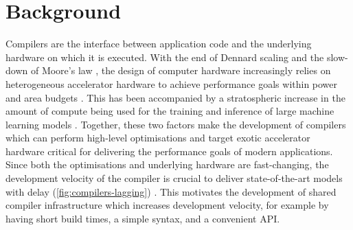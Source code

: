 \chapter{Background}
\label{chap:background}

%

Compilers are the interface between application code and the underlying hardware on which it is executed.
With the end of Dennard scaling and the slow-down of Moore's law \cite{esmaeilzadehDarkSiliconEnd2012}, the design of computer hardware increasingly relies on heterogeneous accelerator hardware to achieve performance goals within power and area budgets \cite{fuchsAcceleratorWallLimits2019}.
This has been accompanied by a stratospheric increase in the amount of compute being used for the training and inference of large machine learning models \cite{desislavovTrendsAIInference2023}.
Together, these two factors make the development of compilers which can perform high-level optimisations and target exotic accelerator hardware critical for delivering the performance goals of modern applications.
Since both the optimisations and underlying hardware are fast-changing, the development velocity of the compiler is crucial to deliver state-of-the-art models with delay (\autoref{fig:compilers-lagging}) \cite{seansilvaHighVelocityArchitectureMLIR2025}.
This motivates the development of shared compiler infrastructure which increases development velocity, for example by having short build times, a simple syntax, and a convenient API.

